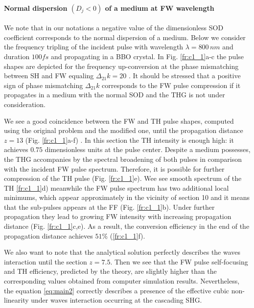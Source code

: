\documentclass[a4paper, 12pt, onecolumn]{extarticle}
\begin{document}
\paragraph*{Normal dispersion $(D_j<0)$ of a medium at FW wavelength }
\label{par:nor}
We note that in our notations a negative value of the dimensionless SOD coefficient corresponds to the normal dispersion of a medium. Below we consider the frequency tripling of the incident pulse with wavelength \(\lambda=800\,nm\) and  duration  \(100fs\) and propagating in a BBO crystal. In Fig. \ref{fr:c1_1}a-c the pulse shapes are depicted for the frequency up-conversion at the phase mismatching between SH and FW equaling \(\Delta_{21}k=20\) . It should be stressed that a positive sign of phase mismatching \(\Delta_{21}k\) corresponds to the FW pulse compression if it propagates in a medium with the normal SOD and the THG is not under consideration.

We see a good coincidence between the FW and TH pulse shapes, computed  using the original problem and the modified one, until the propagation distance \(z=13\) (Fig. \ref{fr:c1_1}a-f) . In this section the TH intensity is enough high: it achieves \(0.75\) dimensionless units at the pulse center. Despite a medium possesses, the THG accompanies by the spectral broadening of  both pulses in comparison with the incident FW pulse spectrum. Therefore, it is possible for further compression of the TH pulse (Fig. \ref{fr:c1_1}e). Wee see smooth spectrum of the TH \ref{fr:c1_1}d) meanwhile the FW pulse spectrum has two additional local minimums, which appear approximately in the vicinity of section 10 and it means that the sub-pulses appears at the FF (Fig. \ref{fr:c1_1}b). Under further propagation they lead to growing FW intensity with increasing  propagation distance (Fig. \ref{fr:c1_1}c,e). As a result, the conversion efficiency in the end of the propagation distance achieves \(51\%\) (\ref{fr:c1_1}f).

 We also want to note that the analytical solution perfectly describes the waves interaction until the section \(z=7.5\). Then we see that the FW pulse self-focusing and TH efficiency, predicted by the theory, are slightly higher than the corresponding values obtained from computer simulation results. Nevertheless, the equation \eqref{eq:main2} correctly describes a presence of the effective cubic non-linearity under waves interaction occurring at the cascading SHG. 
 
\end{document}
